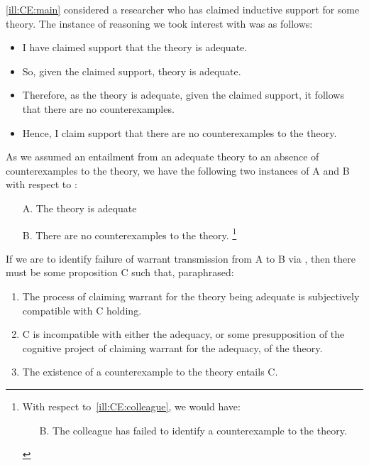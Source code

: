 \begin{note}
  \autoref{ill:CE:main} considered a researcher who has claimed inductive support for some theory.
  The instance of reasoning we took interest with was as follows:

  \begin{itemize}
  \item I have claimed support that the theory is adequate.
  \item So, given the claimed support, theory is adequate.
  \item Therefore, as the theory is adequate, given the claimed support, it follows that there are no counterexamples.
  \item Hence, I claim support that there are no counterexamples to the theory.
  \end{itemize}

  As we assumed an entailment from an adequate theory to an absence of counterexamples to the theory, we have the following two instances of A and B with respect to \wrt{}:

  \begin{itemize}
  \item[A.] The theory is adequate
  \item[B.] There are no counterexamples to the theory.\nolinebreak
    \footnote{
      With respect to~\autoref{ill:CE:colleague}, we would have:
      \begin{itemize}
      \item[B.] The colleague has failed to identify a counterexample to the theory.
      \end{itemize}
    }
  \end{itemize}

  If we are to identify failure of warrant transmission from A to B via \wrt{}, then there must be some proposition C such that, paraphrased:

  \begin{enumerate}[label=\roman*., ref=(\roman*)]
  \item\label{wrt:CE:maini} The process of claiming warrant for the theory being adequate is subjectively compatible with C holding.
  \item\label{wrt:CE:mainii} C is incompatible with either the adequacy, or some presupposition of the cognitive project of claiming warrant for the adequacy, of the theory.
  \item\label{wrt:CE:mainiii} The existence of a counterexample to the theory entails C.
  \end{enumerate}


\end{note}
